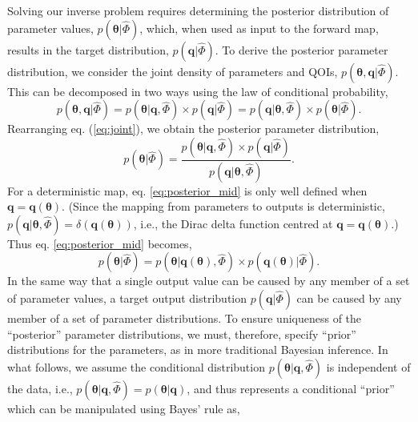 Solving our inverse problem requires determining the posterior distribution of parameter values, $p(\boldsymbol{\theta}|\hat{\Phi})$, which, when used as input to the forward map, results in the target distribution, $p(\boldsymbol{q}|\hat{\Phi})$. To derive the posterior parameter distribution, we consider the joint density of parameters and QOIs, $p(\boldsymbol{\theta},\boldsymbol{q}|\hat{\Phi})$. This can be decomposed in two ways using the law of conditional probability,
%
\begin{equation}\label{eq:joint}
  p( \boldsymbol{\theta}, \boldsymbol{q}|\hat{\Phi})
= p( \boldsymbol{\theta}|\boldsymbol{q}, \hat{\Phi}) \times p(\boldsymbol{q}|\hat{\Phi})
= p( \boldsymbol{q}|\boldsymbol{\theta}, \hat{\Phi}) \times p(\boldsymbol{\theta}|\hat{\Phi}).
\end{equation}
%
Rearranging eq. (\ref{eq:joint}), we obtain the posterior parameter distribution,
%
\begin{equation}\label{eq:posterior_mid}
p(\boldsymbol{\theta}|\hat{\Phi})
= \frac{p(\boldsymbol{\theta}|\boldsymbol{q}, \hat{\Phi}) \times p(\boldsymbol{q}|\hat{\Phi})}{p(\boldsymbol{q}| \boldsymbol{\theta}, \hat{\Phi})}.
\end{equation}
%
For a deterministic map, eq. \eqref{eq:posterior_mid} is only well defined when $\boldsymbol{q}=\boldsymbol{q}(\boldsymbol{\theta})$. (Since the mapping from parameters to outputs is deterministic, $p(\boldsymbol{q}| \boldsymbol{\theta}, \hat{\Phi})=\delta(\boldsymbol{q}(\boldsymbol{\theta}))$, i.e., the Dirac delta function centred at $\boldsymbol{q}=\boldsymbol{q}(\boldsymbol{\theta})$.)
 Thus eq. \eqref{eq:posterior_mid} becomes,
%
\begin{equation}\label{eq:posterior_mid1}
p(\boldsymbol{\theta}|\hat{\Phi})
= p(\boldsymbol{\theta}|\boldsymbol{q}(\boldsymbol{\theta}), \hat{\Phi}) \times p(\boldsymbol{q}(\boldsymbol{\theta})|\hat{\Phi}).
\end{equation}
%
In the same way that a single output value can be caused by any member of a set of parameter values, a target output distribution $p(\boldsymbol{q}|\hat{\Phi})$ can be caused by any member of a set of parameter distributions. To ensure uniqueness of the ``posterior'' parameter distributions, we must, therefore, specify ``prior'' distributions for the parameters, as in more traditional Bayesian inference. In what follows, we assume the conditional distribution $p(\boldsymbol{\theta}|\boldsymbol{q}, \hat{\Phi})$ is independent of the data, i.e., $p(\boldsymbol{\theta}|\boldsymbol{q}, \hat{\Phi})=p(\boldsymbol{\theta}|\boldsymbol{q})$, and thus represents a conditional ``prior'' which can be manipulated using Bayes' rule as,
